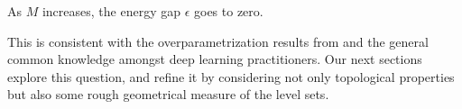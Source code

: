 \begin{corollary}
\label{maincoro}
As $M$ increases, the energy gap $\epsilon$ goes to zero.
\end{corollary}
This is consistent with the overparametrization results from \cite{shamir} and the general common knowledge amongst deep learning practitioners. Our next sections explore this question, and refine it by considering not only topological properties but also some rough geometrical measure of the level sets.








